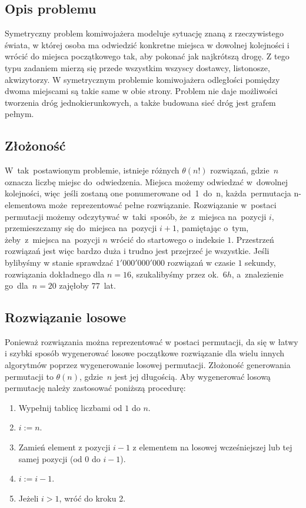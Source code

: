 \subsection{Opis problemu}

Symetryczny problem komiwojażera modeluje sytuację znaną z rzeczywistego świata, w której osoba ma odwiedzić konkretne miejsca w dowolnej kolejności i wrócić do miejsca początkowego tak, aby pokonać jak najkrótszą drogę. Z tego typu zadaniem mierzą się przede wszystkim wszyscy dostawcy, listonosze, akwizytorzy. W symetrycznym problemie komiwojażera odległości pomiędzy dwoma miejscami są takie same w obie strony. Problem nie daje możliwości tworzenia dróg jednokierunkowych, a także budowana sieć dróg jest grafem pełnym.

\subsection{Złożoność}

W~tak~postawionym problemie, istnieje różnych $\theta(n!)$ rozwiązań, gdzie~$n$ oznacza liczbę miejsc do~odwiedzenia. Miejsca możemy odwiedzać w~dowolnej kolejności, więc~jeśli zostaną one ponumerowane od~1~do~n, każda~permutacja n-elementowa może~reprezentować pełne rozwiązanie. Rozwiązanie w~postaci permutacji możemy odczytywać w~taki~sposób, że~z~miejsca na~pozycji $i$, przemieszczamy się do~miejsca na~pozycji $i+1$, pamiętając o~tym, żeby~z~miejsca na~pozycji $n$ wrócić do startowego o indeksie $1$. Przestrzeń rozwiązań jest więc bardzo duża i trudno jest przejrzeć je wszystkie. Jeśli bylibyśmy w stanie sprawdzać $1'000'000'000$ rozwiązań w czasie $1$ sekundy, rozwiązania dokładnego dla $n=16$, szukalibyśmy przez ok.~$6h$, a~znalezienie go~dla~$n=20$ zajęłoby $77$~lat.

\subsection{Rozwiązanie losowe}

Ponieważ rozwiązania można reprezentować w postaci permutacji, da się w łatwy i szybki sposób wygenerować losowe początkowe rozwiązanie dla wielu innych algorytmów poprzez wygenerowanie losowej permutacji. Złożoność generowania permutacji to $\theta(n)$, gdzie~$n$ jest jej długością. Aby wygenerować losową permutację należy zastosować poniższą procedurę:

\begin{enumerate}
    \item Wypełnij tablicę liczbami od $1$ do $n$.
    \item $i := n$.
    \item Zamień element z pozycji $i-1$ z elementem na losowej wcześniejszej lub tej samej pozycji (od $0$ do $i-1$).
    \item $i := i-1$.
    \item Jeżeli $i>1$, wróć do kroku 2.
\end{enumerate}

